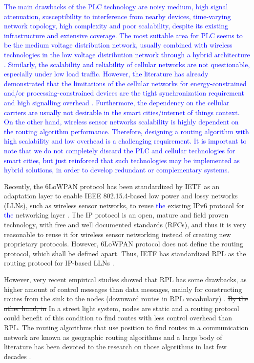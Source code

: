 \documentclass[authoryear,preprint,review,12pt]{elsarticle}
\newcommand{\rev}{\textcolor{blue}}
\begin{document}
\rev{The main drawbacks of the PLC technology are noisy medium, high signal attenuation, susceptibility to interference from nearby devices, time-varying network topology, high complexity and poor scalability, despite its existing infrastructure and extensive coverage. The most suitable area for PLC seems to be the medium voltage distribution network, usually combined with wireless technologies in the low voltage distribution network through a hybrid architecture \citep{PLC_drawbacks}. Similarly, the scalability and reliability of cellular networks are not questionable, especially under low load traffic. However, the literature has already demonstrated that the limitations of the cellular networks for energy-constrained and/or processing-constrained devices are the tight synchronization requirement and high signalling overhead \citep{celullar_iot}. Furthermore, the dependency on the cellular carriers are usually not desirable in the smart cities/internet of things context. On the other hand, wireless sensor networks scalability is highly dependent on the routing algorithm performance. Therefore, designing a routing algorithm with high scalability and low overhead is a challenging requirement. It is important to note that we do not completely discard the PLC and cellular technologies for smart cities, but just reinforced that such technologies may be implemented as hybrid solutions, in order to develop redundant or complementary systems.}


Recently, the 6LoWPAN protocol has been standardized by IETF as an adaptation layer to enable IEEE 802.15.4-based low power and lossy networks (LLNs), such as wireless sensor networks, to reuse \rev{the} existing IPv6 protocol for \rev{the} networking layer \citep{RFC4944}. The IP protocol is an open, mature and field proven technology, with free and well documented standards (RFCs), and thus it is very reasonable to reuse it for wireless sensor networking instead of creating new proprietary protocols. However, 6LoWPAN protocol does not define the routing protocol, which shall be defined apart. Thus, IETF has standardized RPL as the routing protocol for IP-based LLNs \citep{RFC6550}.

However, very recent empirical studies showed that RPL has some drawbacks, as higher amount of control messages than data messages, mainly for constructing routes from the sink to the nodes (downward routes in RPL vocabulary) \citep{Heurtefeux_RPL_2013,P2P_analysis_2010,P2P-RPL_2011}. \sout{By the other hand, in} In a street light system, nodes are static and a routing protocol could benefit of this condition to find routes with less control overhead than RPL. The routing algorithms that use position to find routes in a communication network are known as geographic routing algorithms and a large body of literature has been devoted to the research on those algorithms in last few decades \citep{Karp_GPSR_2000, Position_Based_Routing_Ad_Hoc_2001, On_Optimal_Geographic_Routing_2007, Denardin2011}.
\end{document}
